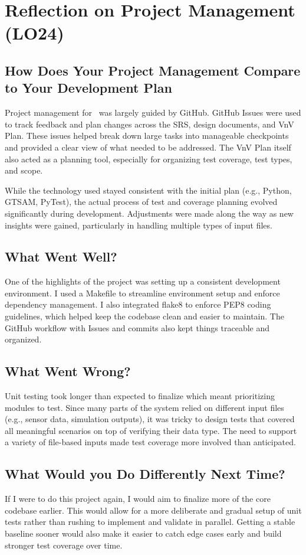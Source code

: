 \documentclass{article}
\begin{document}
\section{Reflection on Project Management (LO24)}

\subsection{How Does Your Project Management Compare to Your Development Plan}

Project management for \progname~was largely guided by GitHub. GitHub Issues were used to track feedback and plan changes across the SRS, design documents, and VnV Plan. These issues helped break down large tasks into manageable checkpoints and provided a clear view of what needed to be addressed. The VnV Plan itself also acted as a planning tool, especially for organizing test coverage, test types, and scope.

While the technology used stayed consistent with the initial plan (e.g., Python, GTSAM, PyTest), the actual process of test and coverage planning evolved significantly during development. Adjustments were made along the way as new insights were gained, particularly in handling multiple types of input files.


\subsection{What Went Well?}

One of the highlights of the project was setting up a consistent development environment. I used a Makefile to streamline environment setup and enforce dependency management. I also integrated flake8 to enforce PEP8 coding guidelines, which helped keep the codebase clean and easier to maintain. The GitHub workflow with Issues and commits also kept things traceable and organized.

\subsection{What Went Wrong?}

Unit testing took longer than expected to finalize which meant prioritizing modules to test. Since many parts of the system relied on different input files (e.g., sensor data, simulation outputs), it was tricky to design tests that covered all meaningful scenarios on top of verifying their data type. The need to support a variety of file-based inputs made test coverage more involved than anticipated.

\subsection{What Would you Do Differently Next Time?}

If I were to do this project again, I would aim to finalize more of the core codebase earlier. This would allow for a more deliberate and gradual setup of unit tests rather than rushing to implement and validate in parallel. Getting a stable baseline sooner would also make it easier to catch edge cases early and build stronger test coverage over time.
\end{document}
